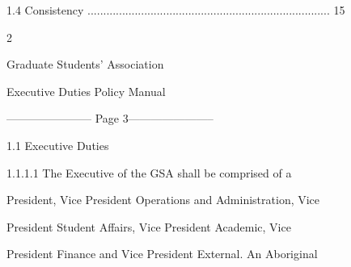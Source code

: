 1.4        Consistency ............................................................................. 15  

  

  

  

  

  

  

  

  

  

  

  

  

  

  

  

  

  

  

  

  

  

  

  

  

  

  

  

  



                                                              2  

                                              

                                            Graduate Students’ Association  

                                            Executive Duties Policy Manual  

  


----------------------- Page 3-----------------------

                                   1.1      Executive Duties   

  

1.1.1.1           The  Executive  of  the  GSA  shall  be  comprised  of  a  

         President, Vice President Operations and Administration, Vice  

         President   Student   Affairs,   Vice   President   Academic,   Vice  

         President Finance and Vice President External. An Aboriginal  

